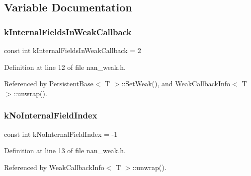 \subsection{Variable Documentation}
\mbox{\label{nan__weak_8h_a3e2540136a5cf5f028bf179fcdbbdf0e}} 
\subsubsection{k\+Internal\+Fields\+In\+Weak\+Callback}
{\footnotesize\ttfamily const int k\+Internal\+Fields\+In\+Weak\+Callback = 2\hspace{0.3cm}{\ttfamily [static]}}



Definition at line 12 of file nan\+\_\+weak.\+h.



Referenced by Persistent\+Base$<$ T $>$\+::\+Set\+Weak(), and Weak\+Callback\+Info$<$ T $>$\+::unwrap().

\mbox{\label{nan__weak_8h_a508576efd7b443e6bde73a2490a9f7ae}} 
\subsubsection{k\+No\+Internal\+Field\+Index}
{\footnotesize\ttfamily const int k\+No\+Internal\+Field\+Index = -\/1\hspace{0.3cm}{\ttfamily [static]}}



Definition at line 13 of file nan\+\_\+weak.\+h.



Referenced by Weak\+Callback\+Info$<$ T $>$\+::unwrap().

